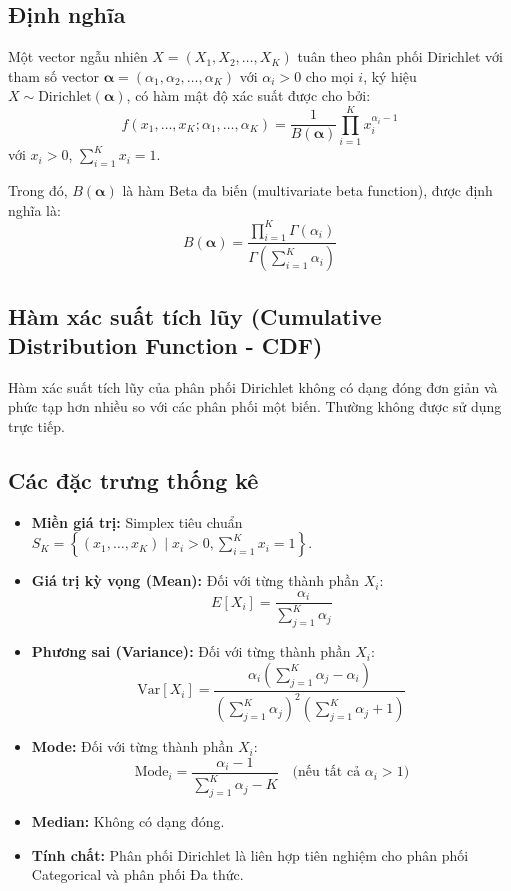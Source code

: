 	\subsection{Định nghĩa}
		Một vector ngẫu nhiên $X = (X_1, X_2, \dots, X_K)$ tuân theo phân phối Dirichlet với tham số vector $\boldsymbol{\alpha} = (\alpha_1, \alpha_2, \dots, \alpha_K)$ với $\alpha_i > 0$ cho mọi $i$, ký hiệu $X \sim \text{Dirichlet}(\boldsymbol{\alpha})$, có hàm mật độ xác suất được cho bởi:
		\[ f(x_1, \dots, x_K; \alpha_1, \dots, \alpha_K) = \frac{1}{B(\boldsymbol{\alpha})} \prod_{i=1}^K x_i^{\alpha_i-1} \]
		với $x_i > 0$, $\sum_{i=1}^K x_i = 1$.
		
		Trong đó, $B(\boldsymbol{\alpha})$ là hàm Beta đa biến (multivariate beta function), được định nghĩa là:
		\[ B(\boldsymbol{\alpha}) = \frac{\prod_{i=1}^K \Gamma(\alpha_i)}{\Gamma\left(\sum_{i=1}^K \alpha_i\right)} \]
	
	\subsection{Hàm xác suất tích lũy (Cumulative Distribution Function - CDF)}
	Hàm xác suất tích lũy của phân phối Dirichlet không có dạng đóng đơn giản và phức tạp hơn nhiều so với các phân phối một biến. Thường không được sử dụng trực tiếp.
	
	\subsection{Các đặc trưng thống kê}
	\begin{itemize}[leftmargin=*]
		\item \textbf{Miền giá trị:} Simplex tiêu chuẩn $S_K = \left\{ (x_1, \dots, x_K) \mid x_i > 0, \sum_{i=1}^K x_i = 1 \right\}$.
		\item \textbf{Giá trị kỳ vọng (Mean):} Đối với từng thành phần $X_i$:
		\[ E[X_i] = \frac{\alpha_i}{\sum_{j=1}^K \alpha_j} \]
		\item \textbf{Phương sai (Variance):} Đối với từng thành phần $X_i$:
		\[ \text{Var}[X_i] = \frac{\alpha_i \left( \sum_{j=1}^K \alpha_j - \alpha_i \right)}{\left( \sum_{j=1}^K \alpha_j \right)^2 \left( \sum_{j=1}^K \alpha_j + 1 \right)} \]
		\item \textbf{Mode:} Đối với từng thành phần $X_i$:
		\[ \text{Mode}_i = \frac{\alpha_i-1}{\sum_{j=1}^K \alpha_j - K} \quad \text{(nếu tất cả } \alpha_i > 1 \text{)} \]
		\item \textbf{Median:} Không có dạng đóng.
		\item \textbf{Tính chất:} Phân phối Dirichlet là liên hợp tiên nghiệm cho phân phối Categorical và phân phối Đa thức.
	\end{itemize}
	
